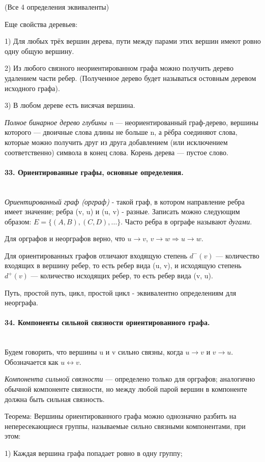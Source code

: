 \documentclass[a4paper, 12pt]{article}
\newcommand{\parag}[1]{\paragraph{#1}\mbox{}\\}
\begin{document}
(Все 4 определения эквиваленты)

\vskip 0.2in

\noindent
Еще свойства деревьев:

1) Для любых трёх вершин дерева, пути между парами этих вершин имеют ровно одну общую вершину. 

2) Из любого связного неориентированном графа можно получить дерево удалением части ребер. (Полученное дерево будет называться остовным деревом исходного графа). 

3) В любом дереве есть висячая вершина.

\vskip 0.2in

\noindent
\textit{Полное бинарное дерево глубины n} — неориентированный граф-дерево, вершины которого — двоичные слова длины не больше n, а рёбра соединяют слова, которые можно получить друг из друга добавлением (или исключением соответственно) символа в конец слова. Корень дерева — пустое слово.


\parag{33. Ориентированные графы, основные определения.}
\textit{Ориентированный граф (орграф)} - такой граф, в котором направление ребра имеет значение; ребра (v, u) и (u, v) - разные. Записать можно следующим образом: $E = \{(A, B), (C, D), ...\}$. Часто ребра в орграфе называют \textit{дугами}. 

\noindent
Для орграфов и неорграфов верно, что $u \rightarrow v$, $v \rightarrow w \Rightarrow u \rightarrow w$. 

\noindent
Для ориентированных графов отличают входящую степень $d^{-}(v)$ — количество входящих в вершину ребер, то есть ребер вида (u, v), и исходящую степень $d^{+}(v)$ — количество исходящих ребер, то есть ребер вида (v, u).

\noindent
Путь, простой путь, цикл, простой цикл - эквивалентно определениям для неорграфа.

\parag{34. Компоненты сильной связности ориентированного графа.}
Будем говорить, что вершины u и v сильно связны, когда $u \rightarrow v$ и $v \rightarrow u$. Обозначается как $u \leftrightarrow v$.

\noindent
\textit{Компонента сильной связности} — определено только для орграфов; аналогично обычной компоненте связности, но между любой парой вершин в компоненте должна быть сильная связность. 

\noindent
Теорема: Вершины ориентированного графа можно однозначно разбить на непересекающиеся группы, называемые сильно связными компонентами, при этом:

1) Каждая вершина графа попадает ровно в одну группу;
\end{document}
